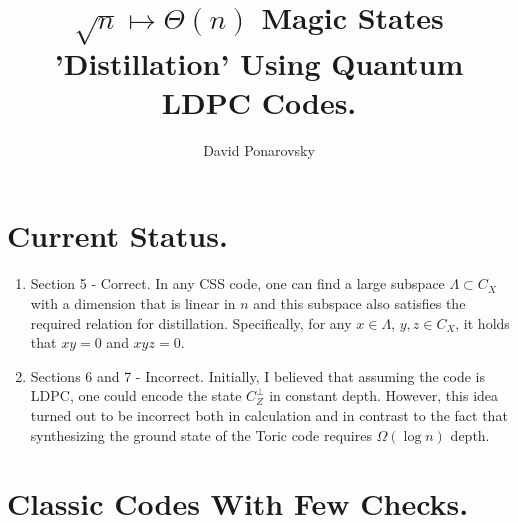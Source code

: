\documentclass[manuscript,screen,review]{acmart}
\begin{document}

\title{ $\sqrt{n} \mapsto \Theta(n)$  Magic States 'Distillation' Using
Quantum LDPC Codes. }
\author{David Ponarovsky}
\maketitle

\section{Current Status.}

\begin{enumerate}
  \item Section 5 - Correct. In any CSS code, one can find a large subspace
    $\Lambda \subset C_{X}$ with a dimension that is linear in $n$ and this
    subspace also satisfies the required relation for distillation.
    Specifically,
    for any $x \in \Lambda$, $y, z \in C_{X}$, it holds that $xy = 0$ and $xyz =
    0$.
  \item Sections 6 and 7 - Incorrect. Initially, I believed that assuming the
    code is LDPC, one could encode the state $C_{Z}^{\perp}$ in constant depth.
    However, this idea turned out to be incorrect both in calculation and in
    contrast to the fact that synthesizing the ground state of the Toric code
    requires $\Omega(\log n)$ depth.
\end{enumerate}

\section{Classic Codes With Few Checks.}
\end{document}
